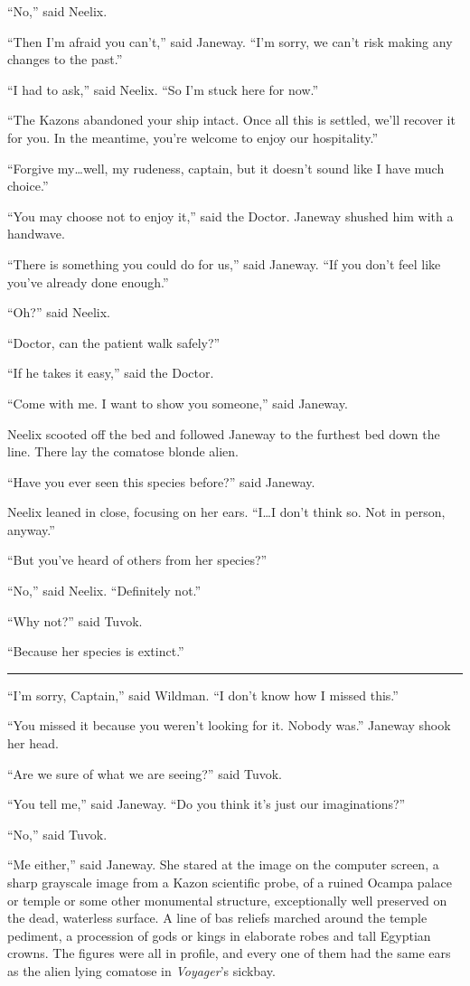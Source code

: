 \documentclass[twoside,letterpaper,12pt]{memoir}
\begin{document}
``No,'' said Neelix. 

``Then I'm afraid you can't,'' said Janeway. ``I'm sorry, we can't risk making any changes to the past.'' 

``I had to ask,'' said Neelix. ``So I'm stuck here for now.'' 

``The Kazons abandoned your ship intact. Once all this is settled, we'll recover it for you. In the meantime, you're welcome to enjoy our hospitality.'' 

``Forgive my\ldots well, my rudeness, captain, but it doesn't sound like I have much choice.'' 

``You may choose not to enjoy it,'' said the Doctor. Janeway shushed him with a handwave. 

``There is something you could do for us,'' said Janeway. ``If you don't feel like you've already done enough.'' 

``Oh?'' said Neelix. 

``Doctor, can the patient walk safely?'' 

``If he takes it easy,'' said the Doctor. 

``Come with me. I want to show you someone,'' said Janeway. 

Neelix scooted off the bed and followed Janeway to the furthest bed down the line. There lay the comatose blonde alien. 

``Have you ever seen this species before?'' said Janeway. 

Neelix leaned in close, focusing on her ears. ``I\ldots I don't think so. Not in person, anyway.'' 

``But you've heard of others from her species?'' 

``No,'' said Neelix. ``Definitely not.'' 

``Why not?'' said Tuvok. 

``Because her species is extinct.'' 

\fancybreak{\rule{3cm}{0.4 pt}} 

``I'm sorry, Captain,'' said Wildman. ``I don't know how I missed this.'' 

``You missed it because you weren't looking for it. Nobody was.'' Janeway shook her head. 

``Are we sure of what we are seeing?'' said Tuvok. 

``You tell me,'' said Janeway. ``Do you think it's just our imaginations?'' 

``No,'' said Tuvok. 

``Me either,'' said Janeway. She stared at the image on the computer screen, a sharp grayscale image from a Kazon scientific probe, of a ruined Ocampa palace or temple or some other monumental structure, exceptionally well preserved on the dead, waterless surface. A line of bas reliefs marched around the temple pediment, a procession of gods or kings in elaborate robes and tall Egyptian crowns. The figures were all in profile, and every one of them had the same ears as the alien lying comatose in \textit{Voyager}'s sickbay. 
\end{document}
